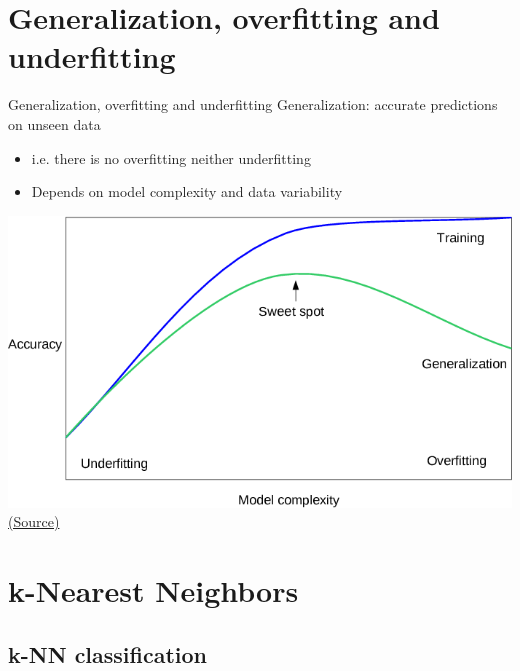 \documentclass[10pt,compress]{beamer} %
\begin{document}
\section[Generalization]{Generalization, overfitting and underfitting}
\begin{frame}{Generalization, overfitting and underfitting}
    Generalization: accurate predictions on unseen data
    \begin{itemize}
	\item i.e. there is no overfitting neither underfitting
	\item Depends on model  complexity and data variability
    \end{itemize}

    \medskip

    \centering \includegraphics[width=0.6\linewidth]{figs/overfitting_underfitting_cartoon.png}
    \tiny{\href{https://github.com/amueller/introduction_to_ml_with_python/blob/master/02-supervised-learning.ipynb}{(Source)}}
\end{frame}



\section{k-Nearest Neighbors}
\subsection{k-NN classification}
\end{document}
